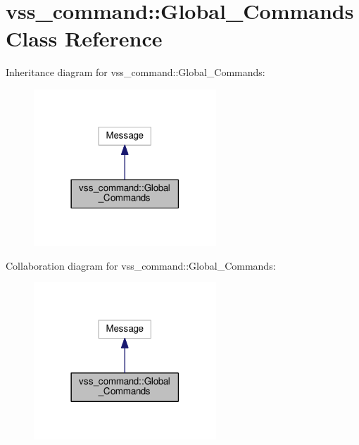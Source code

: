 \hypertarget{classvss__command_1_1Global__Commands}{}\section{vss\+\_\+command\+:\+:Global\+\_\+\+Commands Class Reference}
\label{classvss__command_1_1Global__Commands}


Inheritance diagram for vss\+\_\+command\+:\+:Global\+\_\+\+Commands\+:\nopagebreak
\begin{figure}[H]
\begin{center}
\leavevmode
\includegraphics[width=194pt]{classvss__command_1_1Global__Commands__inherit__graph}
\end{center}
\end{figure}


Collaboration diagram for vss\+\_\+command\+:\+:Global\+\_\+\+Commands\+:\nopagebreak
\begin{figure}[H]
\begin{center}
\leavevmode
\includegraphics[width=194pt]{classvss__command_1_1Global__Commands__coll__graph}
\end{center}
\end{figure}
